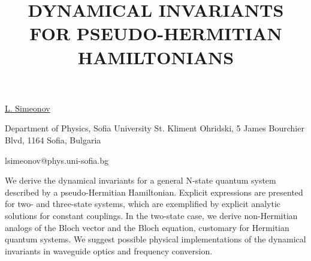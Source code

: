 \title{DYNAMICAL INVARIANTS FOR PSEUDO-HERMITIAN HAMILTONIANS}

\underline{L. Simeonov} 

{\normalsize{\vspace{-4mm}
Department of Physics, Sofia University St. Kliment Ohridski, 5 James Bourchier Blvd, 1164 Sofia, Bulgaria



\email lsimeonov@phys.uni-sofia.bg}}

We derive the dynamical invariants for a general N-state quantum system described by a pseudo-Hermitian
Hamiltonian. Explicit expressions are presented for two- and three-state systems, which are exemplified
by explicit analytic solutions for constant couplings. In the two-state case, we derive non-Hermitian
analogs of the Bloch vector and the Bloch equation, customary for Hermitian quantum systems. We
suggest possible physical implementations of the dynamical invariants in waveguide optics and frequency
conversion.

\vspace{\baselineskip}
